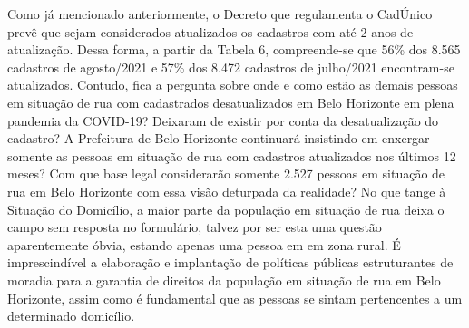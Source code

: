 \documentclass[12pt]{article}
\begin{document}
Como já mencionado anteriormente, o Decreto que regulamenta o CadÚnico prevê que sejam considerados atualizados os cadastros com até 2 anos de atualização. Dessa forma, a partir da Tabela 6, compreende-se que 56\% dos 8.565 cadastros de agosto/2021 e 57\% dos 8.472 cadastros de julho/2021 encontram-se atualizados. Contudo, fica a pergunta sobre onde e como estão as demais pessoas em situação de rua com cadastrados desatualizados em Belo Horizonte em plena pandemia da COVID-19? Deixaram de existir por conta da desatualização do cadastro? A Prefeitura de Belo Horizonte continuará insistindo em enxergar somente as pessoas em situação de rua com cadastros atualizados nos últimos 12 meses? Com que base legal considerarão somente 2.527 pessoas em situação de rua em Belo Horizonte com essa visão deturpada da realidade? No que tange à Situação do Domicílio, a maior parte da população em situação de rua deixa o campo sem resposta no formulário, talvez por ser esta uma questão aparentemente óbvia, estando apenas uma pessoa em em zona rural. É imprescindível a elaboração e implantação de políticas públicas estruturantes de moradia para a garantia de direitos da população em situação de rua em Belo Horizonte, assim como é fundamental que as pessoas se sintam pertencentes a um determinado domicílio.
\end{document}

